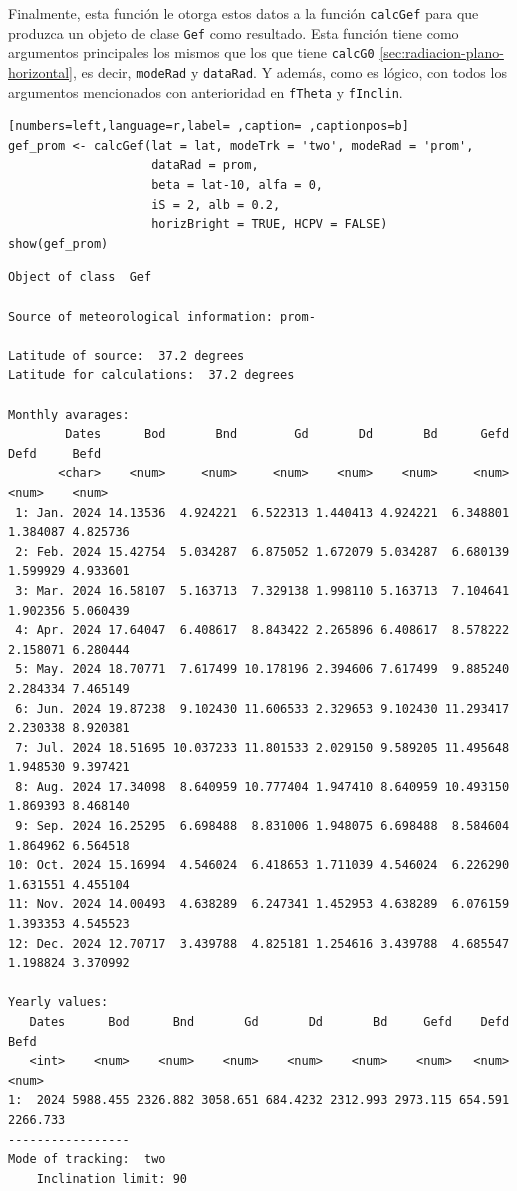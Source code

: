 Finalmente, esta función le otorga estos datos a la función \texttt{calcGef} para que produzca un objeto de clase \texttt{Gef} como resultado. Esta función tiene como argumentos principales los mismos que los que tiene \texttt{calcG0} \ref{sec:radiacion-plano-horizontal}, es decir, \texttt{modeRad} y \texttt{dataRad}. Y además, como es lógico, con todos los argumentos mencionados con anterioridad en \texttt{fTheta} y \texttt{fInclin}.
\begin{lstlisting}[numbers=left,language=r,label= ,caption= ,captionpos=b]
gef_prom <- calcGef(lat = lat, modeTrk = 'two', modeRad = 'prom',
                    dataRad = prom,
                    beta = lat-10, alfa = 0,
                    iS = 2, alb = 0.2,
                    horizBright = TRUE, HCPV = FALSE)
show(gef_prom)
\end{lstlisting}

\begin{verbatim}
Object of class  Gef 

Source of meteorological information: prom- 

Latitude of source:  37.2 degrees
Latitude for calculations:  37.2 degrees

Monthly avarages:
        Dates      Bod       Bnd        Gd       Dd       Bd      Gefd     Defd     Befd
       <char>    <num>     <num>     <num>    <num>    <num>     <num>    <num>    <num>
 1: Jan. 2024 14.13536  4.924221  6.522313 1.440413 4.924221  6.348801 1.384087 4.825736
 2: Feb. 2024 15.42754  5.034287  6.875052 1.672079 5.034287  6.680139 1.599929 4.933601
 3: Mar. 2024 16.58107  5.163713  7.329138 1.998110 5.163713  7.104641 1.902356 5.060439
 4: Apr. 2024 17.64047  6.408617  8.843422 2.265896 6.408617  8.578222 2.158071 6.280444
 5: May. 2024 18.70771  7.617499 10.178196 2.394606 7.617499  9.885240 2.284334 7.465149
 6: Jun. 2024 19.87238  9.102430 11.606533 2.329653 9.102430 11.293417 2.230338 8.920381
 7: Jul. 2024 18.51695 10.037233 11.801533 2.029150 9.589205 11.495648 1.948530 9.397421
 8: Aug. 2024 17.34098  8.640959 10.777404 1.947410 8.640959 10.493150 1.869393 8.468140
 9: Sep. 2024 16.25295  6.698488  8.831006 1.948075 6.698488  8.584604 1.864962 6.564518
10: Oct. 2024 15.16994  4.546024  6.418653 1.711039 4.546024  6.226290 1.631551 4.455104
11: Nov. 2024 14.00493  4.638289  6.247341 1.452953 4.638289  6.076159 1.393353 4.545523
12: Dec. 2024 12.70717  3.439788  4.825181 1.254616 3.439788  4.685547 1.198824 3.370992

Yearly values:
   Dates      Bod      Bnd       Gd       Dd       Bd     Gefd    Defd     Befd
   <int>    <num>    <num>    <num>    <num>    <num>    <num>   <num>    <num>
1:  2024 5988.455 2326.882 3058.651 684.4232 2312.993 2973.115 654.591 2266.733
-----------------
Mode of tracking:  two 
    Inclination limit: 90
\end{verbatim}


